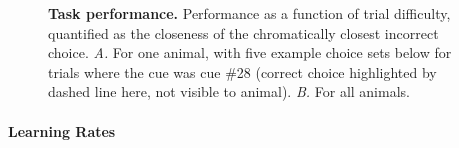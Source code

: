 \begin{figure}

\caption{\textbf{Task performance.}
Performance as a function of trial difficulty, quantified as the closeness of the chromatically closest incorrect choice.
\emph{A.} For one animal, with five example choice sets below for trials where the cue was cue \#28 (correct choice highlighted by dashed line here, not visible to animal).
\emph{B.} For all animals.
} 
\label{fig:DataAnalysis}
\end{figure}

\paragraph{Learning Rates}
